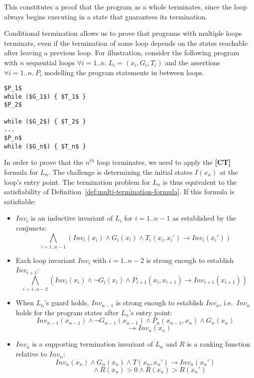 \documentclass[a4paper]{llncs}
\begin{document}
This constitutes a proof that the program as a whole terminates, since the loop always begins
executing in a state that guarantees its termination.\\



\iffalse

Conditional termination allows us to
prove that programs with multiple loops terminate, even if the termination of some loop depends on the states
reachable after leaving a previous loop.
For illustration, consider the following program with $n$ sequential loops $\forall i=1..n. ~L_i=(x_i,G_i,T_i)$ and
the assertions $\forall i=1..n. ~P_i$ modelling the program statements in between loops. 

\begin{lstlisting}[mathescape=true]
$P_1$
while ($G_1$) { $T_1$ }
$P_2$

while ($G_2$) { $T_2$ }
...
$P_n$
while ($G_n$) { $T_n$ }
\end{lstlisting}

In order to prove that the $n^{th}$ loop terminates, we need to apply the {\bf [CT]} formula for $L_n$.
The challenge is determining the initial states  $I(x_n)$ at the loop's entry point.  
The termination problem for $L_n$ is thus equivalent to the satisfiability of
Definition~\ref{def:multi-termination-formula}.  If this formula is satisfiable:
\begin{itemize}
\item $Inv_i$ is an inductive invariant of $L_i$ for $i=1..{n-1}$ as established by the conjuncts:
$$\bigwedge_{i=1..n{-}1} (Inv_i(x_i) \wedge G_i(x_i) \wedge T_i(x_i, x_i') \rightarrow Inv_i(x_i')) $$

\item Each loop invariant $Inv_i$ with $i=1..{n-2}$ is strong enough to establish $Inv_{i+1}$:
$$\bigwedge_{i=1..n{-}2} (Inv_i(x_i) \wedge \lnot G_i(x_i) \wedge P_{i+1}(x_i, x_{i+1}) {\rightarrow} Inv_{i+1}(x_{i+1})) ~$$

\item When $L_n$'s guard holds, $Inv_{n-1}$ 
is strong enough to establish $Inv_n$, i.e.~$Inv_n$ holds for the program states after $L_n$'s entry point:
$$ Inv_{n-1}(x_{n-1}) \wedge \lnot G_{n-1}(x_{n-1}) \wedge P_n(x_{n-1},x_n) \wedge G_n(x_n) $$
$$\qquad\qquad\rightarrow Inv_n(x_n)$$

\item $Inv_n$ is a supporting termination invariant of $L_n$ and $R$ is a ranking function relative to $Inv_n$:
$$Inv_n(x_n) \wedge G_n(x_n) \wedge T(x_n, x_n') \rightarrow Inv_n(x_n')$$
$$ \qquad \qquad \wedge R(x_n) > 0 \wedge R(x_n) > R(x_n')$$
\end{itemize}
\end{document}
